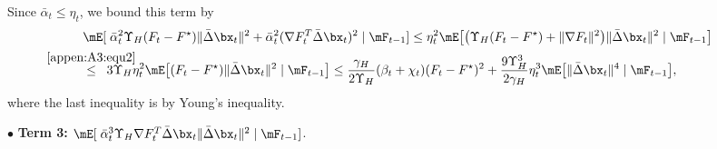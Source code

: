 \noindent Since $\bar{\alpha}_t\leq \eta_t$, we bound this term by
\begin{align}\label{appen:A3:equ5}
&\mE[\;\bar{\alpha}_t^2 \Upsilon_{H}(F_t - F^\star)\|\bar{\Delta} \bx_t\|^2 +\bar{\alpha}_t^2(\nabla F_t^{T} \bar{\Delta} \bx_t)^2\mid \mF_{t-1}] \leq \eta_t^2 \mE\big[\big(\Upsilon_{H}(F_t-F^\star) + \|\nabla F_t\|^2\big)\|\bar{\Delta} \bx_t\|^2\mid \mF_{t-1}\big]\nonumber\\
&\stackrel{\mathclap{\eqref{appen:A3:equ2}}}{\leq}\;\;3\Upsilon_{H}\eta_t^2\mE\big[(F_t-F^\star)\|\bar{\Delta} \bx_t\|^2\mid \mF_{t-1}\big] \leq \frac{\gamma_H}{2\Upsilon_H}(\beta_t+\chi_t) (F_t-F^\star)^2+\frac{9\Upsilon_H^3}{2\gamma_H}\eta_t^3 \mE\big[\|\bar{\Delta} \bx_t\|^4\mid \mF_{t-1}\big],
\end{align}
where the last inequality is by Young's inequality.

\vskip4pt
\noindent$\bullet$ \textbf{Term 3:} $\mE[\;\bar{\alpha}_t^3 \Upsilon_H \nabla F_t^{T} \bar{\Delta}\bx_t\|\bar{\Delta} \bx_t\|^2\mid \mF_{t-1}]$.

